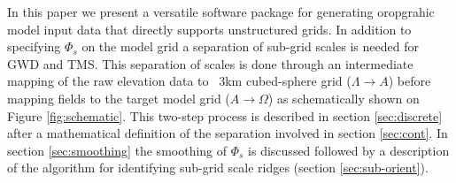 \documentclass[gmd]{copernicus}
\begin{document}
{\color{red}{Julio: please describe input data of ridges ...}}

%

In this paper we present a versatile software package for generating oropgrahic model input data that directly supports unstructured grids. In addition to specifying $\Phi_s$ on the model grid a separation of sub-grid scales is needed for GWD and TMS. This separation of scales is done through an intermediate mapping of the raw elevation data to ~3km cubed-sphere grid ($\Lambda \rightarrow A$) before mapping fields to the target model grid ($A \rightarrow \Omega$) as schematically shown on Figure \ref{fig:schematic}. This two-step process is described in section \ref{sec:discrete} after a mathematical definition of the separation involved in section \ref{sec:cont}. In section \ref{sec:smoothing} the smoothing of $\Phi_s$ is discussed followed by a description of the algorithm for identifying sub-grid scale ridges (section \ref{sec:sub-orient}).
\end{document}
